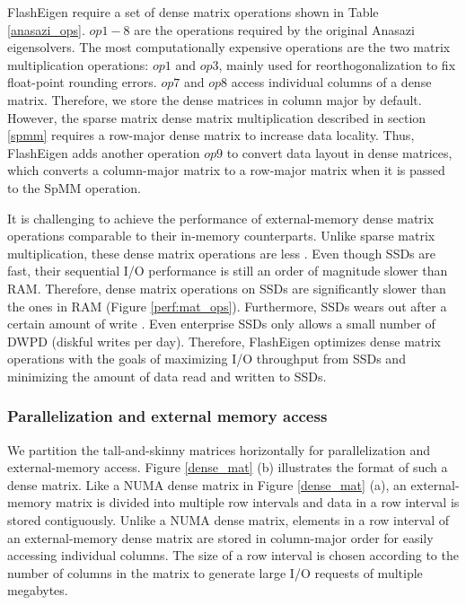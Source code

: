 FlashEigen require a set of dense matrix operations shown in Table
\ref{anasazi_ops}. $op1-8$ are the operations required by the original Anasazi
eigensolvers. The most computationally expensive operations are the two
matrix multiplication operations: $op1$ and $op3$, mainly used for
reorthogonalization to fix float-point rounding errors.
$op7$ and $op8$ access individual columns of a dense matrix.
Therefore, we store the dense matrices in column major by default.
However, the sparse matrix dense matrix multiplication described in section
\ref{spmm} requires a row-major dense matrix to increase data locality.
Thus, FlashEigen adds another operation $op9$ to convert data layout
in dense matrices, which converts a column-major matrix to a row-major
matrix when it is passed to the SpMM operation.

It is challenging to achieve the performance of external-memory dense matrix
operations comparable to their in-memory counterparts. Unlike sparse matrix
multiplication, these dense matrix operations are less . Even though SSDs are fast, their sequential I/O performance is
still an order of magnitude slower than RAM. Therefore, dense matrix operations
on SSDs are significantly slower than the ones in RAM (Figure \ref{perf:mat_ops}).
Furthermore, SSDs wears out after a certain amount of write \cite{}.
Even enterprise SSDs \cite{} only allows a small number of DWPD
(diskful writes per day). Therefore, FlashEigen optimizes dense matrix operations
with the goals of maximizing I/O throughput from SSDs and minimizing the amount
of data read and written to SSDs.

%		

\subsubsection{Parallelization and external memory access}
We partition the tall-and-skinny matrices horizontally for parallelization
and external-memory access. Figure \ref{dense_mat} (b) illustrates the format
of such a dense matrix. Like a NUMA dense matrix in Figure \ref{dense_mat} (a),
an external-memory matrix is divided into multiple row intervals and data
in a row interval is stored contiguously. Unlike a NUMA dense matrix, elements
in a row interval of an external-memory dense matrix are stored in column-major order
for easily accessing individual columns. The size of a row interval is chosen
according to the number of columns in the matrix to generate large I/O requests
of multiple megabytes.

